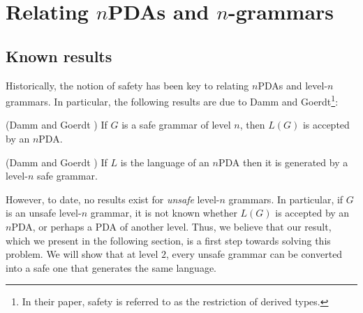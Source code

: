 \section{Relating $n$PDAs and $n$-grammars}

\subsection{Known results}

Historically, the notion of safety has been key to relating
$n$PDAs and level-$n$ grammars. In particular, the following
results are due to Damm and Goerdt\footnote{In their paper, safety
is referred to as the restriction of derived types.}:

\begin{theorem} (Damm and Goerdt \cite{DG86}) If $G$ is a safe grammar of
level $n$, then $L(G)$ is accepted by an $n$PDA.
\end{theorem}

\begin{theorem} (Damm and Goerdt \cite{DG86}) If $L$ is the language
of an $n$PDA then it is generated by a level-$n$ safe grammar.
\end{theorem}


However, to date, no results exist for \emph{unsafe} level-$n$
grammars. In particular, if $G$ is an unsafe level-$n$ grammar, it
is not known whether $L(G)$ is accepted by an $n$PDA, or perhaps a
PDA of another level. Thus, we believe that our result, which we
present in the following section, is a first step towards solving
this problem. We will show that at level $2$, every unsafe grammar
can be converted into a safe one that generates the same language.\\


%

